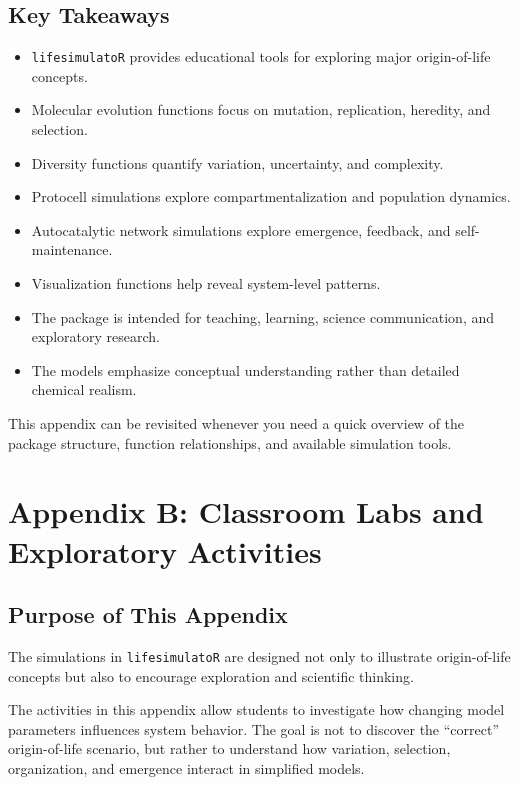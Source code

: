 \documentclass[
  oneside,
  openany]{book}
\providecommand{\tightlist}{%
  \setlength{\itemsep}{0pt}\setlength{\parskip}{0pt}}
\begin{document}
\section{Key Takeaways}\label{key-takeaways-5}

\begin{itemize}
\tightlist
\item
  \texttt{lifesimulatoR} provides educational tools for exploring major origin-of-life concepts.
\item
  Molecular evolution functions focus on mutation, replication, heredity, and selection.
\item
  Diversity functions quantify variation, uncertainty, and complexity.
\item
  Protocell simulations explore compartmentalization and population dynamics.
\item
  Autocatalytic network simulations explore emergence, feedback, and self-maintenance.
\item
  Visualization functions help reveal system-level patterns.
\item
  The package is intended for teaching, learning, science communication, and exploratory research.
\item
  The models emphasize conceptual understanding rather than detailed chemical realism.
\end{itemize}

This appendix can be revisited whenever you need a quick overview of the package structure, function relationships, and available simulation tools.

\chapter{Appendix B: Classroom Labs and Exploratory Activities}\label{appendix-b-classroom-labs-and-exploratory-activities}

\section{Purpose of This Appendix}\label{purpose-of-this-appendix-1}

The simulations in \texttt{lifesimulatoR} are designed not only to illustrate origin-of-life concepts but also to encourage exploration and scientific thinking.

The activities in this appendix allow students to investigate how changing model parameters influences system behavior. The goal is not to discover the ``correct'' origin-of-life scenario, but rather to understand how variation, selection, organization, and emergence interact in simplified models.
\end{document}
